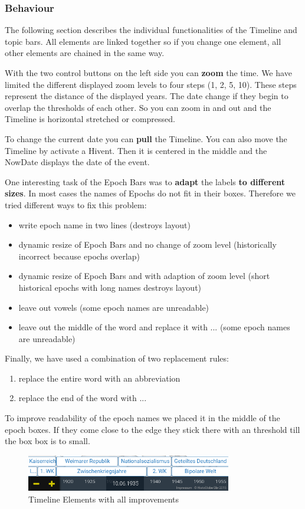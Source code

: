 \subsubsection{Behaviour}
The following section describes the individual functionalities of the Timeline and topic bars. All elements are linked together so if you change one element, all other elements are chained in the same way.

With the two control buttons on the left side you can \textbf{zoom} the time. We have limited the different displayed zoom levels to four steps (1, 2, 5, 10). These steps represent the distance of the displayed years. The date change if they begin to overlap the thresholds of each other. So you can zoom in and out and the Timeline is horizontal stretched or compressed.

To change the current date you can \textbf{pull} the Timeline. You can also move the Timeline by activate a Hivent. Then it is centered in the middle and the NowDate displays the date of the event.

One interesting task of the Epoch Bars was to \textbf{adapt} the labels \textbf{to different sizes}. In most cases the names of Epochs do not fit in their boxes. Therefore we tried different ways to fix this problem:

\begin{itemize}
	\item write epoch name in two lines (destroys layout)
	\item dynamic resize of Epoch Bars and no change of zoom level (historically incorrect because epochs overlap)
	\item dynamic resize of Epoch Bars and with adaption of zoom level (short historical epochs with long names destroys layout)
	\item leave out vowels (some epoch names are unreadable)
	\item leave out the middle of the word and replace it with ... (some epoch names are unreadable)
\end{itemize}

Finally, we have used a combination of two replacement rules:

\begin{enumerate}
	\item replace the entire word with an abbreviation
	\item replace the end of the word with ...
\end{enumerate}

To improve readability of the epoch names we placed it in the middle of the epoch boxes. If they come close to the edge they stick there with an threshold till the box box is to small.

\begin{figure}[H]
	\centering
	\includegraphics[width=0.8\textwidth]{graphics/timeline_elements2.png}
	\caption{Timeline Elements with all improvements}
	\label{fig:Timeline_Elements2}
\end{figure}

